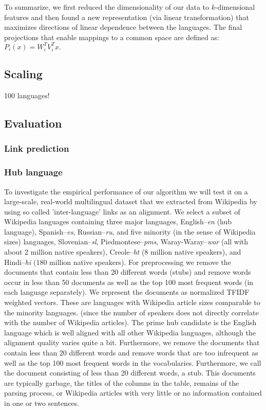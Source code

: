 \documentclass[twoside,11pt]{article}
\begin{document}
To summarize, we first reduced the dimensionality of our data to $k$-dimensional features and then found a new representation (via linear transformation) that maximizes directions of linear dependence between the languages. The final projections that enable mappings to a common space are defined as: $P_i(x) = W_i^T V_i^T x.$


\subsection{Scaling}

100 languages!


\subsection{Evaluation}
 
\subsubsection{Link prediction}

\subsubsection{Hub language}


To investigate the empirical performance of our algorithm we will test it on a large-scale, real-world multilingual dataset that we extracted from Wikipedia  by  using so called 'inter-language' links as an alignment. We select a subset of Wikipedia languages containing three major languages, English--\emph{en} (hub language), Spanish--\emph{es}, Russian--\emph{ru}, and five minority (in the sense of Wikipedia sizes) languages, Slovenian--\emph{sl}, Piedmontese--\emph{pms}, Waray-Waray--\emph{war} (all with about 2 million native speakers), Creole--\emph{ht} (8 million native speakers), and Hindi--\emph{hi} (180 million native speakers). For preprocessing we remove the documents that contain less than 20 different words (stubs) and remove words occur in less than 50 documents as well as the top 100 most frequent words (in each language separately). We represent the documents as normalized TFIDF\cite{Salton88term-weightingapproaches} weighted vectors. These are languages with Wikipedia article sizes comparable to the minority languages.  (since the number of speakers does not directly correlate with the number of Wikipedia articles). The prime hub candidate is the English language which is well aligned with all other Wikipedia languages, although the alignment quality varies quite a bit. Furthermore, we remove the documents that contain less than 20 different words and remove words that are too infrequent as well as the top 100 most frequent words in the vocabularies. Furthermore, we call the document consisting of less than 20 different words, a stub. This documents are typically garbage, the titles of the columns in the table, remains of the parsing process, or Wikipedia articles with very little or no information contained in one or two sentences.
\end{document}
